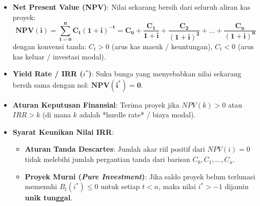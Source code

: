 \documentclass[10pt,a4paper]{article}
\begin{document}
\begin{rumusbox}
\begin{itemize}[leftmargin=1.5em, topsep=1.5pt, itemsep=2pt]
    \item \textbf{Net Present Value (NPV)}: Nilai sekarang bersih dari seluruh aliran kas proyek:
    \begin{equation*}
        \mathbf{NPV(i) = \sum_{t=0}^n C_t (1+i)^{-t} = C_0 + \frac{C_1}{1+i} + \frac{C_2}{(1+i)^2} + \dots + \frac{C_n}{(1+i)^n}}
    \end{equation*}
    dengan konvensi tanda: $C_t > 0$ (arus kas masuk / keuntungan), $C_t < 0$ (arus kas keluar / investasi modal).
    \item \textbf{Yield Rate / IRR ($i^*$)}: Suku bunga yang menyebabkan nilai sekarang bersih sama dengan nol: $\mathbf{NPV(i^*) = 0}$.
    \item \textbf{Aturan Keputusan Finansial}: Terima proyek jika $NPV(k) > 0$ atau $IRR > k$ (di mana $k$ adalah *hurdle rate* / biaya modal).
    \item \textbf{Syarat Keunikan Nilai IRR}:
    \begin{itemize}[leftmargin=1.2em, topsep=1pt, itemsep=1.5pt]
        \item \textbf{Aturan Tanda Descartes}: Jumlah akar riil positif dari $NPV(i)=0$ tidak melebihi jumlah pergantian tanda dari barisan $C_0, C_1, \dots, C_n$.
        \item \textbf{Proyek Murni (\textit{Pure Investment})}: Jika saldo proyek belum terlunasi memenuhi $B_t(i^*) \le 0$ untuk setiap $t < n$, maka nilai $i^* > -1$ dijamin \textbf{unik tunggal}.
    \end{itemize}
\end{itemize}
\end{rumusbox}
\end{document}

